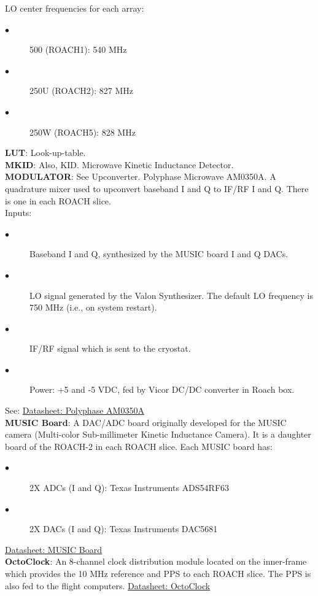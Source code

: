 LO center frequencies for each array:
\begin{description}
  \item[$\bullet$] 500 (ROACH1): 540 MHz
  \item[$\bullet$] 250U (ROACH2): 827 MHz
  \item[$\bullet$] 250W (ROACH5): 828 MHz
\end{description}
\textbf{LUT}: Look-up-table.\\
\textbf{MKID}: Also, KID. Microwave Kinetic Inductance Detector.\\
\textbf{MODULATOR}: See Upconverter. Polyphase Microwave AM0350A. A quadrature mixer used to upconvert baseband I and Q to IF/RF I and Q. There is one in each ROACH slice.\\
Inputs:
\begin{description}
  \item[$\bullet$] Baseband I and Q, synthesized by the MUSIC board I and Q DACs.
  \item[$\bullet$] LO signal generated by the Valon Synthesizer. The default LO frequency is 750 MHz (i.e., on system restart).
  \item[$\bullet$ ]IF/RF signal which is sent to the cryostat.
  \item[$\bullet$] Power: +5 and -5 VDC, fed by Vicor DC/DC converter in Roach box.
\end{description}
See: \href{https://polyphasemicrowave.com/media/AM0350A_RevA.pdf}{Datasheet: Polyphase AM0350A}\\
\textbf{MUSIC Board}: A DAC/ADC board originally developed for the MUSIC camera (Multi-color Sub-millimeter Kinetic Inductance Camera). It is a daughter board of the ROACH-2 in each ROACH slice. Each MUSIC board has:
\begin{description}
  \item[$\bullet$] 2X ADCs (I and Q): Texas Instruments ADS54RF63
  \item[$\bullet$] 2X DACs (I and Q): Texas Instruments DAC5681
\end{description}
\href{https://www.techneinstruments.com/boards-for-roach}{Datasheet: MUSIC Board}\\
\textbf{OctoClock}: An 8-channel clock distribution module located on the inner-frame which provides the 10 MHz reference and PPS to each ROACH slice. The PPS is also fed to the flight computers. \href{https://www.ettus.com/product/details/OctoClock}{Datasheet: OctoClock}\\

